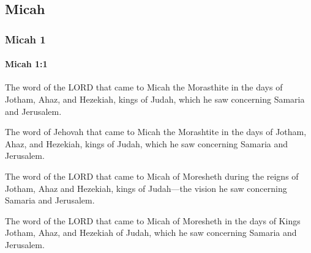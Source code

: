 \subsection{Micah}
	\label{MICAH}

	\subsubsection{Micah 1} %
		\label{MICAH-1}

		\paragraph{Micah 1:1} %
			\label{MICAH-1-1}

			The word of the LORD that came to Micah the Morasthite in the days of Jotham, Ahaz, and Hezekiah, kings of Judah, which he saw concerning Samaria and Jerusalem.

			\begin{versebox}
					\item[BHS] 
					\item[LXX] 
					\item[ASV] The word of Jehovah that came to Micah the Morashtite in the days of Jotham, Ahaz, and Hezekiah, kings of Judah, which he saw concerning Samaria and Jerusalem.
					\item[NIV] The word of the LORD that came to Micah of Moresheth during the reigns of Jotham, Ahaz and Hezekiah, kings of Judah—the vision he saw concerning Samaria and Jerusalem.
					\item[NRSV] The word of the LORD that came to Micah of Moresheth in the days of Kings Jotham, Ahaz, and Hezekiah of Judah, which he saw concerning Samaria and Jerusalem.
			\end{versebox}

